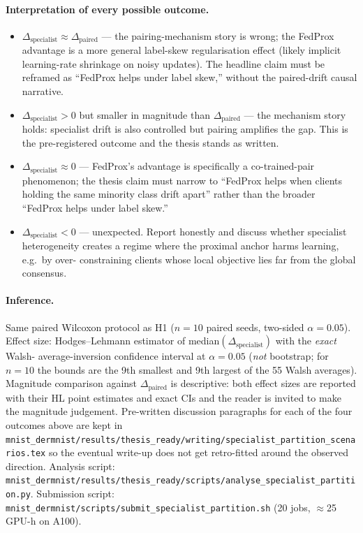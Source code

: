 \documentclass[11pt,a4paper]{article}
\begin{document}
\paragraph{Interpretation of every possible outcome.}
\begin{itemize}
  \item $\Delta_{\mathrm{specialist}} \approx \Delta_{\mathrm{paired}}$ —
    the pairing-mechanism story is wrong; the FedProx advantage is a more
    general label-skew regularisation effect (likely implicit
    learning-rate shrinkage on noisy updates). The headline claim must
    be reframed as ``FedProx helps under label skew,'' without the
    paired-drift causal narrative.
  \item $\Delta_{\mathrm{specialist}} > 0$ but smaller in magnitude than
    $\Delta_{\mathrm{paired}}$ — the mechanism story holds: specialist
    drift is also controlled but pairing amplifies the gap. This is the
    pre-registered outcome and the thesis stands as written.
  \item $\Delta_{\mathrm{specialist}} \approx 0$ — FedProx's advantage
    is specifically a co-trained-pair phenomenon; the thesis claim must
    narrow to ``FedProx helps when clients holding the same minority
    class drift apart'' rather than the broader ``FedProx helps under
    label skew.''
  \item $\Delta_{\mathrm{specialist}} < 0$ — unexpected. Report
    honestly and discuss whether specialist heterogeneity creates a
    regime where the proximal anchor harms learning, e.g.\ by over-
    constraining clients whose local objective lies far from the global
    consensus.
\end{itemize}

\paragraph{Inference.}
Same paired Wilcoxon protocol as H1 ($n=10$ paired seeds, two-sided
$\alpha = 0.05$). Effect size: Hodges--Lehmann estimator of
median$(\Delta_{\mathrm{specialist}})$ with the \emph{exact} Walsh-
average-inversion confidence interval at $\alpha = 0.05$
(\emph{not} bootstrap; for $n=10$ the bounds are the 9th smallest and
9th largest of the 55 Walsh averages). Magnitude comparison against
$\Delta_{\mathrm{paired}}$ is descriptive: both effect sizes are reported
with their HL point estimates and exact CIs and the reader is invited to
make the magnitude judgement. Pre-written discussion paragraphs for each
of the four outcomes above are kept in
\texttt{mnist\_dermnist/results/thesis\_ready/writing/specialist\_partition\_scenarios.tex}
so the eventual write-up does not get retro-fitted around the observed
direction. Analysis script:
\texttt{mnist\_dermnist/results/thesis\_ready/scripts/analyse\_specialist\_partition.py}.
Submission script: \texttt{mnist\_dermnist/scripts/submit\_specialist\_partition.sh}
(20 jobs, $\approx$25 GPU-h on A100).
\end{document}
